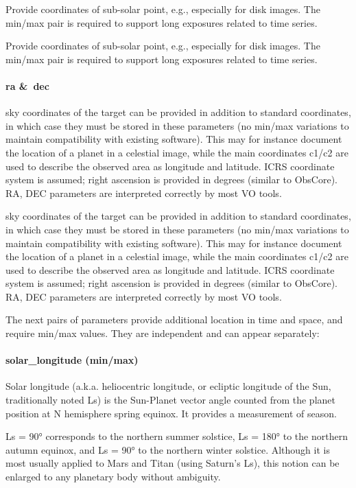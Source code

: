 \documentclass[11pt,a4paper]{ivoa}
\begin{document}
Provide coordinates of sub-solar point, e.g., especially for disk images. The min/max pair is required to support long exposures related to time series.

Provide coordinates of sub-solar point, e.g., especially for disk images. The min/max pair is required to support long exposures related to time series.

\paragraph{ra \& dec}

sky coordinates of the target can be provided in addition to standard coordinates, in which case they must be stored in these parameters (no min/max variations to maintain compatibility with existing software). This may for instance document the location of a planet in a celestial image, while the main coordinates c1/c2 are used to describe the observed area as longitude and latitude. ICRS coordinate system is assumed; right ascension is provided in degrees (similar to ObsCore). RA, DEC parameters are interpreted correctly by most VO tools.

sky coordinates of the target can be provided in addition to standard coordinates, in which case they must be stored in these parameters (no min/max variations to maintain compatibility with existing software). This may for instance document the location of a planet in a celestial image, while the main coordinates c1/c2 are used to describe the observed area as longitude and latitude. ICRS coordinate system is assumed; right ascension is provided in degrees (similar to ObsCore). RA, DEC parameters are interpreted correctly by most VO tools.

The next pairs of parameters provide additional location in time and space, and require min/max values. They are independent and can appear separately:

\paragraph{solar\_longitude (min/max)}

Solar longitude (a.k.a. heliocentric longitude, or ecliptic longitude of the Sun, traditionally noted Ls) is the Sun-Planet vector angle counted from the planet position at N hemisphere spring equinox. It provides a measurement of season.

Ls = 90° corresponds to the northern summer solstice, Ls = 180° to the northern autumn equinox, and Ls = 90° to the northern winter solstice. Although it is most usually applied to Mars and Titan (using Saturn's Ls), this notion can be enlarged to any planetary body without ambiguity.
\end{document}
